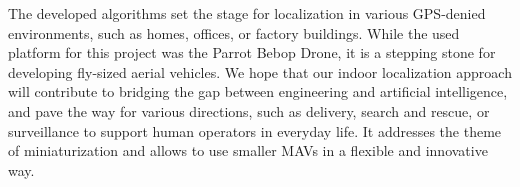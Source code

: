 The developed algorithms set the stage for localization in various
GPS-denied environments, such as homes, offices, or factory buildings. While the used platform for this project was the Parrot Bebop Drone,
it is a stepping stone for developing fly-sized aerial vehicles.
We hope that our indoor localization approach will contribute to
bridging the gap between engineering and artificial intelligence, and
pave the way for various directions, such as delivery, search and
rescue, or surveillance to support human operators in everyday
life. It addresses the theme of miniaturization and allows to use
smaller MAVs in a flexible and innovative way.